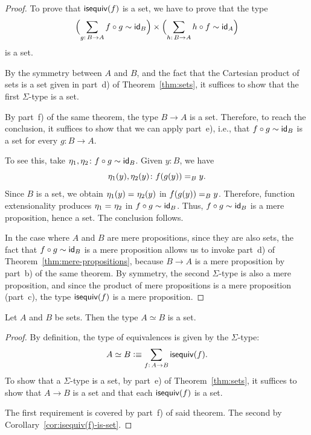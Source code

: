 \begin{proof}
    To prove that $\mathsf{isequiv}(f)$ is a set, we have to prove that the type
    \[
        \Bigl(
            \sum_{g\colon B\to A}f\circ g\sim\id_B
        \Bigr)
        \times
        \Bigl(
            \sum_{h\colon B\to A}h\circ f\sim\id_A
        \Bigr)
    \]
    is a set.

    By the symmetry between $A$ and $B$, and the fact that the Cartesian product of sets is a set given in part~d) of Theorem~\ref{thm:sets}, it suffices to show that the first $\Sigma$-type is a set.

    By part~f) of the same theorem, the type $B\to A$ is a set. Therefore, to reach the conclusion, it suffices to show that we can apply part~e), i.e., that $f\circ g\sim\mathsf{id}_B$ is a set for every $g\colon B\to A$.

    To see this, take $\eta_1,\eta_2\colon f\circ g\sim\id_B$. Given $y\colon B$, we have
    \[
        \eta_1(y),\eta_2(y)\colon f(g(y))\eq By.
    \]
    Since $B$ is a set, we obtain $\eta_1(y)\mathrel{=_{}}\eta_2(y)$ in $f(g(y))\mathrel{=_{B}}y$. Therefore, function extensionality produces $\eta_1\mathrel{=_{}}\eta_2$ in $f\circ g\sim\mathsf{id}_B$. Thus, $f\circ g\sim\mathsf{id}_B$ is a mere proposition, hence a set. The conclusion follows.

    In the case where $A$ and $B$ are mere propositions, since they are also sets, the fact that $f\circ g\sim\mathsf{id}_B$ is a mere proposition allows us to invoke part~d) of Theorem~\ref{thm:mere-propositions}, because $B\to A$ is a mere proposition by part~b) of the same theorem. By symmetry, the second $\Sigma$-type is also a mere proposition, and since the product of mere propositions is a mere proposition (part~c), the type $\mathsf{isequiv}(f)$ is a mere proposition.
\end{proof}

\begin{cor}\fe\label{cor:set-simeq-set-is-set}
    Let\/ $A$ and\/ $B$ be sets. Then the type\/ $A\simeq B$ is a set.
\end{cor}

\begin{proof}
    By definition, the type of equivalences is given by the $\Sigma$-type:
    \[
        A\simeq B\defeq\sum_{f\colon A\to B}\fun{isequiv}(f).
    \]
    To show that a $\Sigma$-type is a set, by part~e) of Theorem~\ref{thm:sets}, it suffices to show that $A\to B$ is a set and that each $\mathsf{isequiv}(f)$ is a set.
    
    The first requirement is covered by part~f) of said theorem. The second by Corollary~\ref{cor:isequiv(f)-is-set}.
\end{proof}

